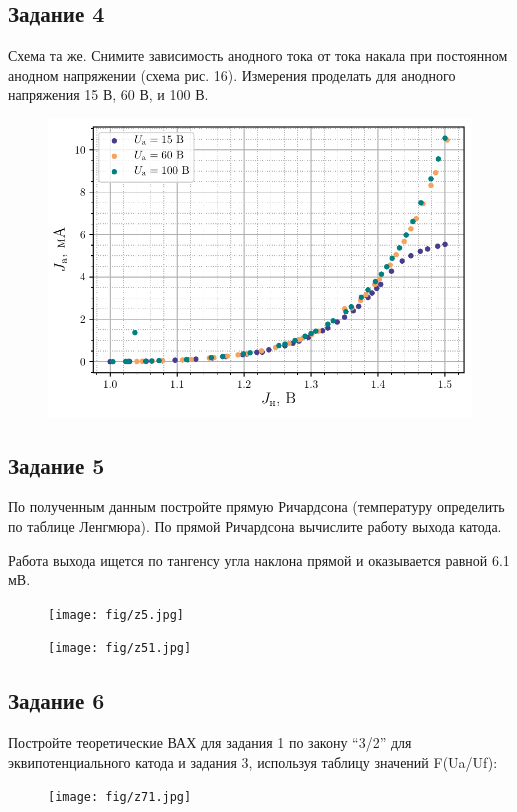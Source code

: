\subsection{Задание 4}
Схема та же. Снимите зависимость анодного тока от тока накала при постоянном анодном напряжении (схема рис. 16). Измерения проделать для анодного напряжения 15 В, 60 В, и 100 В.

\begin{figure}[H]
	\centering
    \includegraphics[width=0.85\linewidth]{scripts/fig4}
	\caption{}
	\label{fig:18}
\end{figure}

\subsection{Задание 5}
По полученным данным постройте прямую Ричардсона (температуру определить по таблице Ленгмюра). По прямой Ричардсона вычислите работу выхода катода.

Работа выхода ищется по тангенсу угла наклона прямой и оказывается равной 6.1 мВ.

\begin{figure}[H]
	\centering
	\texttt{[image: fig/z5.jpg]}
	\caption{}
	\label{fig:19}
\end{figure}

\begin{figure}[H]
	\centering
	\texttt{[image: fig/z51.jpg]}
	\caption{}
	\label{fig:20}
\end{figure}

\subsection{Задание 6}
 Постройте теоретические ВАХ для задания 1 по закону “3/2” для эквипотенциального катода и задания 3, используя таблицу значений F(Ua/Uf):
 \begin{figure}[H]
	\centering
	\texttt{[image: fig/z71.jpg]}
	\caption{}
	\label{fig:21}
\end{figure}

